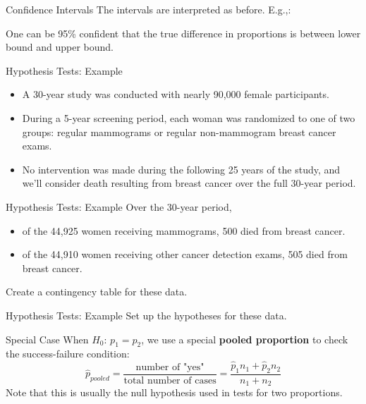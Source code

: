 \begin{frame}{Confidence Intervals}
    The intervals are interpreted as before. E.g.,:
    
    \vspace{12pt}One can be 95\% confident that the true difference in proportions is between lower bound and upper bound.
\end{frame}

\begin{frame}{Hypothesis Tests: Example}
    \begin{itemize}
        \item A 30-year study was conducted with nearly 90,000 female participants.
        \item During a 5-year screening period, each woman was randomized to one of two groups: regular mammograms or regular non-mammogram breast cancer exams.
        \item No intervention was made during the following 25 years of the study, and we’ll consider death resulting from breast cancer over the full 30-year period.
    \end{itemize}
\end{frame}

\begin{frame}{Hypothesis Tests: Example}
    Over the 30-year period,
    \begin{itemize}
        \item of the 44,925 women receiving mammograms, 500 died from breast cancer.
        \item of the 44,910 women receiving other cancer detection exams, 505 died from breast cancer.
    \end{itemize}
    Create a contingency table for these data.
\end{frame}

\begin{frame}{Hypothesis Tests: Example}
    Set up the hypotheses for these data.
\end{frame}

\begin{frame}{Special Case}
    When $H_0$: $p_1=p_2$, we use a special \textbf{pooled proportion} to check the success-failure condition:
    \[
        \hat{p}_{pooled} = \frac{\text{number of "yes"}}{\text{total number of cases}} = \frac{\hat{p}_1 n_1 + \hat{p}_2 n_2}{n_1 + n_2}
    \]
    Note that this is usually the null hypothesis used in tests for two proportions.
\end{frame}

